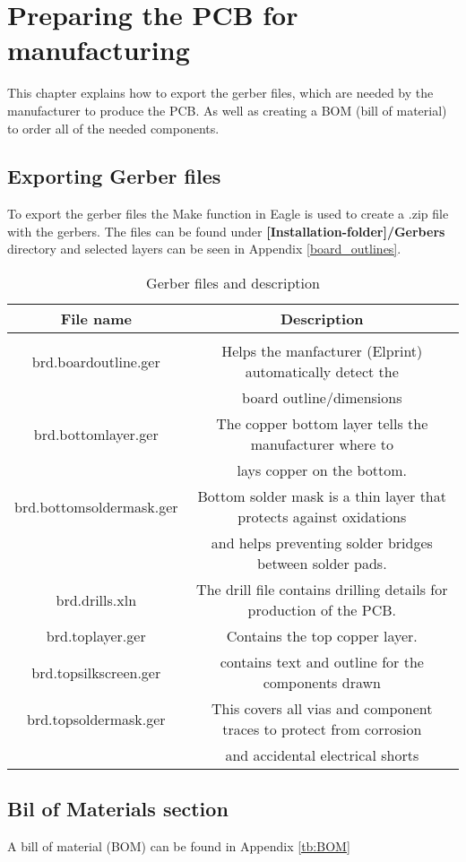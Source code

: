 
\chapter{Preparing the PCB for manufacturing}
This chapter explains how to export the gerber files, which are needed by the manufacturer to produce the PCB. As well as creating a BOM (bill of material) to order all of the needed components.


\section{Exporting Gerber files} 
To export the gerber files the Make function in Eagle is used to create a .zip file with the gerbers. 
The files can be found under \textbf{[Installation-folder]/Gerbers} directory and selected layers can be seen in Appendix \ref{board_outlines}.


\begin{table}[h]
\centering
\begin{tabular}{|c|c|}
\hline 
\rowcolor{Gray}
File name & Description \\ 
\hline \\
brd.boardoutline.ger & Helps the manfacturer (Elprint) automatically detect the  \\ 
 & board outline/dimensions \\ 

\hline 
brd.bottomlayer.ger & The copper bottom layer tells the manufacturer where to\\ 
 &  lays copper on the bottom. \\ 
\hline 
brd.bottomsoldermask.ger & Bottom solder mask is a thin layer that protects against oxidations \\ 

 & and helps preventing solder bridges between solder pads. \\ 
\hline 
brd.drills.xln & The drill file contains drilling details for production of the PCB.  \\ 
\hline 
brd.toplayer.ger & Contains the top copper layer. \\ 
\hline 
brd.topsilkscreen.ger & contains text and outline for the components drawn   \\ 
\hline 
brd.topsoldermask.ger & This covers all vias and component traces to protect from corrosion  \\
				     & and accidental electrical shorts\\
\hline
\end{tabular} 
\caption{Gerber files and description}
\label{tb:gerber}
\end{table}
\section{Bil of Materials section}
A bill of material (BOM) can be found in Appendix \ref{tb:BOM}


